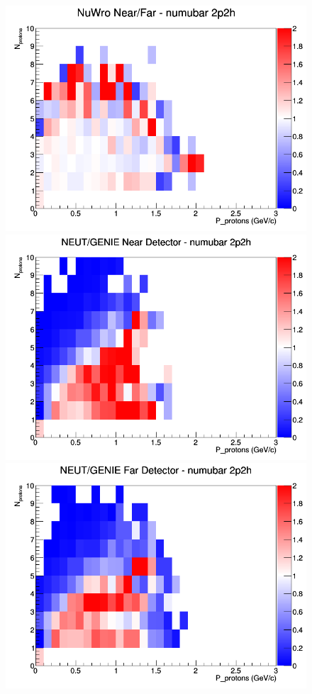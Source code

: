 \begin{figure}[h]
\endminipage
{}
\includegraphics[width=\linewidth]{N_P/nominal/protons/ratios/2p2h_NuWro_numubar_NF_N_P.png}
\endminipage
\newline
{}
\includegraphics[width=\linewidth]{N_P/nominal/protons/ratios/2p2h_NEUT_GENIE_numubar_near_N_P.png}
\endminipage
{}
\includegraphics[width=\linewidth]{N_P/nominal/protons/ratios/2p2h_NEUT_GENIE_numubar_far_N_P.png}

\end{figure}
